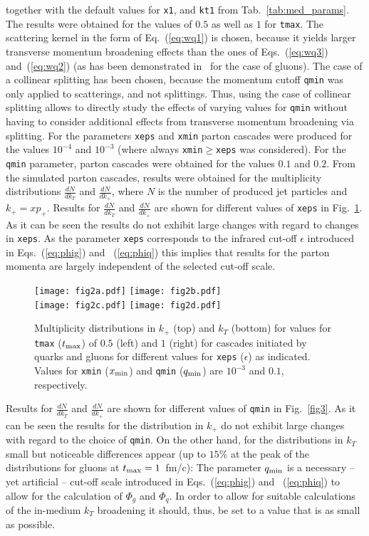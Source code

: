 \documentclass[preprint,12pt]{elsarticle}
\begin{document}
\noindent
together with the default values for \verb#x1#, and \verb#kt1# from Tab.~\ref{tab:med_params}. The results were obtained for the values of $0.5$ as well as $1$ for \verb#tmax#. 
The scattering kernel in the form of Eq.~(\ref{eq:wq1}) is chosen, because it yields larger transverse momentum broadening effects than the ones of Eqs.~(\ref{eq:wq3}) and~(\ref{eq:wq2}) (as has been demonstrated in~\cite{Blanco:2020uzy} for the case of gluons).
The case of a collinear splitting has been chosen, because the momentum cutoff \verb#qmin# was only applied to scatterings, and not splittings. Thus, using the case of collinear splitting allows to directly study the effects of varying values for \verb#qmin# without having to consider additional effects from transverse momentum broadening via splitting.
For the parameters \verb#xeps# and \verb#xmin# parton cascades were produced for the values $10^{-4}$ and $10^{-3}$ (where always \verb#xmin#$\geq$\verb#xeps# was considered).
For the \verb#qmin# parameter, parton cascades were obtained for the values $0.1$ and $0.2$. 
From the simulated parton cascades, results were obtained for the multiplicity distributions $\frac{dN}{dk_T}$ and $\frac{dN}{dk_+}$, where $N$ is the number of produced jet particles and $k_+=xp_+$.
Results for $\frac{dN}{dk_T}$ and $\frac{dN}{dk_+}$  are shown for different values of \texttt{xeps} in Fig.~\ref{fig2}. As it can be seen the results do not exhibit large changes with regard to changes in \texttt{xeps}. As the parameter \texttt{xeps} corresponds to the infrared cut-off $\epsilon$ introduced in Eqs.~(\ref{eq:phig}) and ~(\ref{eq:phiq}) this implies that results for the parton momenta are largely independent of the selected cut-off scale.
\begin{figure}
\texttt{[image: fig2a.pdf]}
\texttt{[image: fig2b.pdf]}\\
\texttt{[image: fig2c.pdf]}
\texttt{[image: fig2d.pdf]}
\caption{Multiplicity distributions in $k_+$ (top) and $k_T$ (bottom) for values for \texttt{tmax} ($t_{\rm max}$) of $0.5$ (left) and $1$ (right) for cascades initiated by quarks and gluons for different values for \texttt{xeps} ($\epsilon$) as indicated. Values for \texttt{xmin} ($x_{\rm min}$) and \texttt{qmin} ($q_{\rm min}$) are $10^{-3}$ and $0.1$, respectively.}
\label{fig2}
\end{figure}
Results for $\frac{dN}{dk_T}$ and $\frac{dN}{dk_+}$  are shown for different values of \texttt{qmin} in Fig.~\ref{fig3}. As it can be seen the results for the distribution in $k_+$ do not exhibit large changes with regard to the choice of \texttt{qmin}. On the other hand, for the distributions in $k_T$ small but noticeable differences appear (up to $15$\% at the peak of the distributions for gluons at $t_{\rm max}=1$~fm/c): The parameter $q_{\rm min}$ is a necessary -- yet artificial -- cut-off scale introduced in Eqs.~(\ref{eq:phig}) and ~(\ref{eq:phiq}) to allow for the calculation of $\Phi_g$ and $\Phi_q$. In order to allow for suitable calculations of the in-medium $k_T$ broadening it should, thus, be set to a value that is as small as possible.
\end{document}
